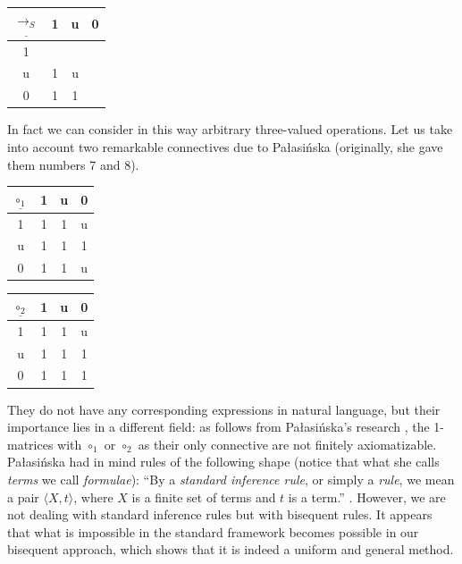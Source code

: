 \documentclass[10pt,a4paper]{article}
\theoremstyle{definition}
\newcommand{\3}{\vspace{.3in}}
\newcommand{\2}{\vspace{.2in}}
\newcommand{\1}{\vspace{.1in}}
\newcommand{\5}{\vspace{.05in}}
\begin{document}
\1

\begin{tabular}{|c|ccc|}
	\hline
	$\underline{\rightarrow_S} $ & 1 & u & 0 \\
	\hline
	1 &  &  &  \\
	u & 1 & u &  \\
	0 & 1 & 1 &  \\
	\hline
\end{tabular}

\1

In fact we can consider in this way arbitrary three-valued operations. Let us take into account two remarkable connectives due to Pa\l{}asi\'{n}ska \cite{Palasinska} (originally, she gave them numbers 7 and 8). 

\begin{center}
	\begin{tabular}{|c|ccc|}
		\hline
		$\underline{\circ_1} $ & 1 & u & 0 \\
		\hline
		1 & 1 & 1 & u \\
		u & 1 & 1 & 1 \\
		0 & 1 & 1 & u \\
		\hline
	\end{tabular}
	\begin{tabular}{|c|ccc|}
		\hline
		$\underline{\circ_2} $ & 1 & u & 0 \\
		\hline
		1 & 1 & 1 & u \\
		u & 1 & 1 & 1 \\
		0 & 1 & 1 & 1 \\
		\hline
	\end{tabular}
\end{center}



They do not have any corresponding expressions in natural language, but their importance lies in a different field: as follows from Pa\l{}asi\'{n}ska's research \cite{Palasinska}, the 1-matrices with $ \circ_1 $ or $\circ_2$ as their only connective are not finitely axiomatizable. Pa\l{}asi\'{n}ska had in mind rules of the following shape (notice that what she calls \textit{terms} we call \textit{formulae}): 
``By a \textit{standard inference rule}, or simply a \textit{rule}, we mean a pair $ \langle X,t\rangle$, where $ X $ is a finite set of terms and $ t $ is a term.'' \cite[p. 362]{Palasinska}. However, we are not dealing with standard inference rules but with bisequent rules. It appears that  what is impossible in the standard framework becomes possible in our bisequent approach, which shows that it is indeed a uniform and general method.
\end{document}
